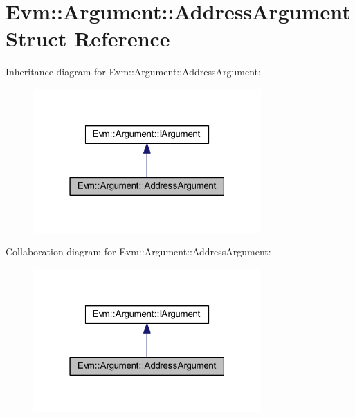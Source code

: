 \hypertarget{struct_evm_1_1_argument_1_1_address_argument}{}\section{Evm\+:\+:Argument\+:\+:Address\+Argument Struct Reference}
\label{struct_evm_1_1_argument_1_1_address_argument}


Inheritance diagram for Evm\+:\+:Argument\+:\+:Address\+Argument\+:
\nopagebreak
\begin{figure}[H]
\begin{center}
\leavevmode
\includegraphics[width=247pt]{struct_evm_1_1_argument_1_1_address_argument__inherit__graph}
\end{center}
\end{figure}


Collaboration diagram for Evm\+:\+:Argument\+:\+:Address\+Argument\+:
\nopagebreak
\begin{figure}[H]
\begin{center}
\leavevmode
\includegraphics[width=247pt]{struct_evm_1_1_argument_1_1_address_argument__coll__graph}
\end{center}
\end{figure}
